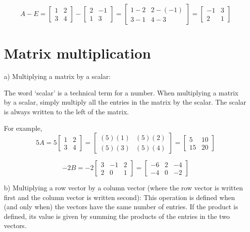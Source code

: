 \documentclass[12pt]{article}
\begin{document}
$$ A - E = 
    \left[ \begin{array}{cc}  1 & 2 \\ 3 & 4  \end{array} \right]
 -  \left[ \begin{array}{cc}  2 & -1 \\ 1 & 3 \end{array} \right]
 =  \left[ \begin{array}{cc}  1-2 & 2-(-1) \\ 3-1 & 4-3 \end{array} \right]
 =  \left[ \begin{array}{cc}  -1 & 3 \\ 2 & 1 \end{array} \right]$$


\section{Matrix multiplication}

a) Multiplying a matrix by a scalar:

The word `scalar' is a technical term for a number.  When multiplying a 
matrix by a scalar, simply multiply all the entries in the matrix by the
scalar.  The scalar is always written to the left of the matrix.

For example,
$$5A = 
    5\left[ \begin{array}{cc}  1 & 2 \\ 3 & 4  \end{array} \right]
 =  \left[ \begin{array}{cc}  (5)(1) & (5)(2) \\ (5)(3) & (5)(4)  \end{array} \right]
 =  \left[ \begin{array}{cc}  5 & 10 \\ 15 & 20 \end{array} \right]$$

$$-2B =  -2\left[ \begin{array}{ccc}  3 & -1 & 2 \\ 2 & 0 & 1  \end{array} \right]
 = \left[ \begin{array}{ccc}  -6 & 2 & -4 \\ -4 & 0 & -2  \end{array} \right]$$

b) Multiplying a row vector by a column vector (where the row vector is written
first and the column vector is written second):
This operation is defined when (and only
when) the vectors have the same number of entries.
If the product is defined, its value is given
by summing the products of the entries in the two vectors.
\end{document}
